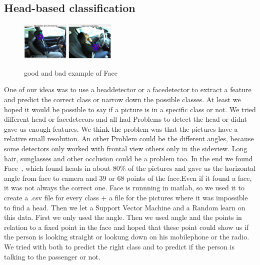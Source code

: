 \documentclass[10pt,twocolumn,letterpaper]{article}
\begin{document}
\subsection{Head-based classification}
\begin{figure}[h]
	\centering
	\includegraphics[width=0.2\textwidth]{face1}\hspace{0.01\textwidth}
	\includegraphics[width=0.2\textwidth]{faces/face7}\\ \vspace{0.01\textwidth}
	\caption{good and bad example of Face}
	\label{face_estimation_example}
\end{figure}
One of our ideas was to use a headdetector or a facedetector to extract a feature and predict the correct class or narrow down the possible classes. At least we hoped it would be possible to say if a picture is in a specific class or not. We tried different head or facedetecors and all had Problems to detect the head or didnt gave us enough features. We think the problem was that the pictures have a relative small resolution. An other Problem could be the different angles, because some detectors only worked with frontal view others only in the sideview. Long hair, sunglasses and other occlusion could be a problem too. In the end we found Face~\cite{Ramanan:2012:FDP:2354409.2355119}, which found heads in about 80\% of the pictures and gave us the horizontal angle from face to camera and 39 or 68 points of the face.Even if it found a face, it was not always the correct one. Face is runnning in matlab, so we used it to create a .csv file for every class + a file for the pictures where it was impossible to find a head. Then we let a Support Vector Machine and a Random learn on this data. First we only used the angle. Then we used angle and the points in relation to a fixed point in the face and hoped that these point could show us if the person is looking straight or lookung down on his mobilephone or the radio. We tried with both to predict the right class and to predict if the person is talking to the passenger or not.
\end{document}
